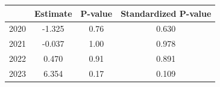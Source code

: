 \begin{tabular}{lccc}
\hline
 & Estimate & P-value & Standardized P-value \\
\hline
2020 & -1.325 & 0.76 & 0.630 \\
2021 & -0.037 & 1.00 & 0.978 \\
2022 & 0.470 & 0.91 & 0.891 \\
2023 & 6.354 & 0.17 & 0.109 \\
\hline
\end{tabular}
